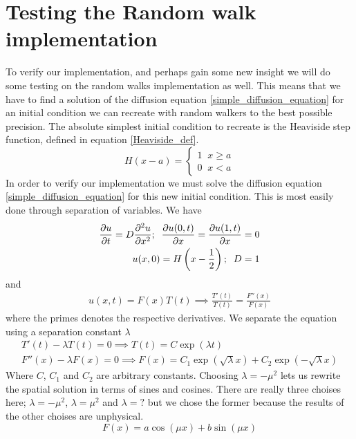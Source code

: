 \section{Testing the Random walk implementation}\label{testing_random_walks}



To verify our implementation, and perhaps gain some new insight we will do some testing on the random walks implementation as well. 
This means that we have to find a solution of the diffusion equation \ref{simple_diffusion_equation} for an initial condition we can recreate with random walkers to the best possible precision. 
The absolute simplest initial condition to recreate is the Heaviside step function, defined in equation \ref{Heaviside_def}. 
\begin{equation}\label{Heaviside_def}
 H(x-a) = \begin{cases}
           1\;\;x\geq a\\
           0\;\;x<a
          \end{cases}
\end{equation}
In order to verify our implementation we must solve the diffusion equation \ref{simple_diffusion_equation} for this new initial condition. 
This is most easily done through separation of variables. We have
\begin{align*}
 \frac{\partial u}{\partial t} = D\frac{\partial^2 u}{\partial x^2};\;\; \frac{\partial u(0,t)}{\partial x} = \frac{\partial u(1,t)}{\partial x} = 0 \\
 u(x,0) = H\left(x-\frac{1}{2}\right);\;\; D = 1
\end{align*}
and
\begin{align*}
 u(x,t) = F(x)T(t) \implies \frac{T'(t)}{T(t)} = \frac{F''(x)}{F(x)}
\end{align*}
where the primes denotes the respective derivatives. We separate the equation using a separation constant $\lambda$
\begin{align*}
 T'(t)-\lambda T(t) = 0 \implies T(t) = C\exp(\lambda t)\\
 F''(x) -\lambda F(x) = 0 \implies F(x) = C_1\exp(\sqrt{\lambda}x) + C_2\exp(-\sqrt{\lambda}x)
\end{align*}
Where $C$, $C_1$ and $C_2$ are arbitrary constants. 
Choosing $\lambda = -\mu^2$ lets us rewrite the spatial solution in terms of sines and cosines. 
There are really three choises here; $\lambda = -\mu^2$, $\lambda = \mu^2$ and $\lambda = ?$ but we chose the former because the results of the other choises are unphysical.
\begin{equation*}
 F(x) = a\cos(\mu x) + b\sin(\mu x)
\end{equation*}
